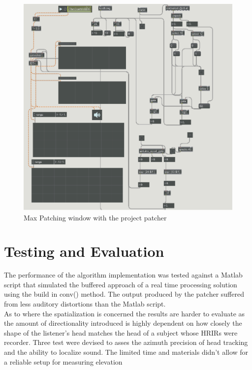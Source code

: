 \documentclass[a4paper,12pt,oneside]{article}
\begin{document}
\
\begin{figure}[H]
\includegraphics[scale=0.8]{patcher.png}
 \caption{Max Patching window with the project patcher}
    \label{fig:patc}
\end{figure}
 

\section{Testing and Evaluation}

The performance of the algorithm implementation was tested against a Matlab script that simulated the buffered approach of a real time processing solution using the build in conv() method. The output produced by the patcher suffered from less auditory distortions than the Matlab script.\\

As to where the spatialization is concerned the results are harder to evaluate as the amount of directionality introduced is highly dependent on how closely the shape of the listener's head matches the head of a subject whose HRIRs were recorder. Three test were devised to asses the azimuth precision of head tracking and the ability to localize sound. The limited time and materials didn't allow for a reliable setup for measuring elevation\\
\end{document}
